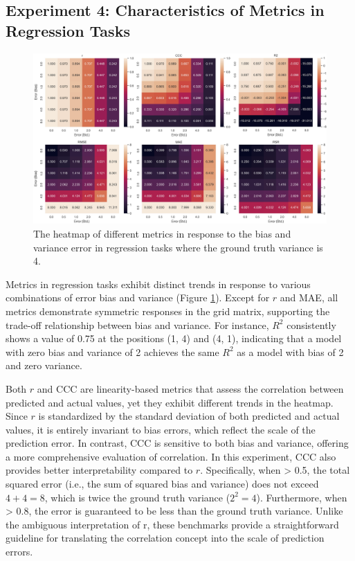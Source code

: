 \subsection{Experiment 4: Characteristics of Metrics in Regression Tasks}

\begin{figure}[H]
    \centering
    \includegraphics[width=1\textwidth]{fig_9.jpg}
    \caption{The heatmap of different metrics in response to the bias and variance error in regression tasks where the ground truth variance is 4.}
    \label{fig:s4_reg}
\end{figure}

Metrics in regression tasks exhibit distinct trends in response to various combinations of error bias and variance (Figure \ref{fig:s4_reg}). Except for $r$ and MAE, all metrics demonstrate symmetric responses in the grid matrix, supporting the trade-off relationship between bias and variance. For instance, $R^2$ consistently shows a value of 0.75 at the positions (1, 4) and (4, 1), indicating that a model with zero bias and variance of 2 achieves the same $R^2$ as a model with bias of 2 and zero variance.

Both $r$ and CCC are linearity-based metrics that assess the correlation between predicted and actual values, yet they exhibit different trends in the heatmap. Since $r$ is standardized by the standard deviation of both predicted and actual values, it is entirely invariant to bias errors, which reflect the scale of the prediction error. In contrast, CCC is sensitive to both bias and variance, offering a more comprehensive evaluation of correlation. In this experiment, CCC also provides better interpretability compared to $r$. Specifically, when  > 0.5, the total squared error (i.e., the sum of squared bias and variance) does not exceed $4 + 4 = 8$, which is twice the ground truth variance ($2^2 = 4$). Furthermore, when  > 0.8, the error is guaranteed to be less than the ground truth variance. Unlike the ambiguous interpretation of r, these benchmarks provide a straightforward guideline for translating the correlation concept into the scale of prediction errors.

